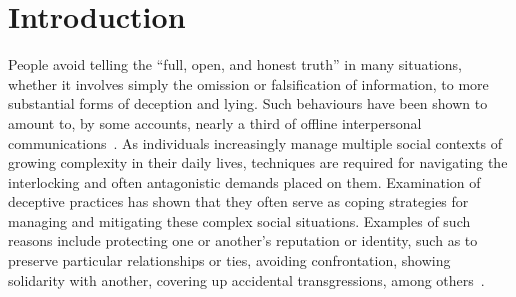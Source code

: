 \documentclass{sig-alternate}
\begin{document}





\section{Introduction}

People avoid telling the ``full, open, and honest truth'' in many situations, whether it involves simply the omission or falsification of information, to more substantial forms of deception and lying.  Such behaviours have been shown to amount to, by some accounts, nearly a third of offline interpersonal communications~\cite{depaulo1996lying,bok2011lying}. 
As individuals increasingly manage multiple social contexts of growing complexity in their daily lives, techniques are required for navigating the interlocking and often antagonistic demands placed on them.
Examination of deceptive practices has shown that they often serve as coping strategies for managing and mitigating these complex social situations.
Examples of such reasons include protecting one or another's reputation or identity, such as to preserve particular relationships or ties, avoiding confrontation, showing solidarity with another, covering up accidental transgressions, among others~\cite{hancock2007digital, Burgoon:2003:TDM:820748.821362}.
\end{document}
